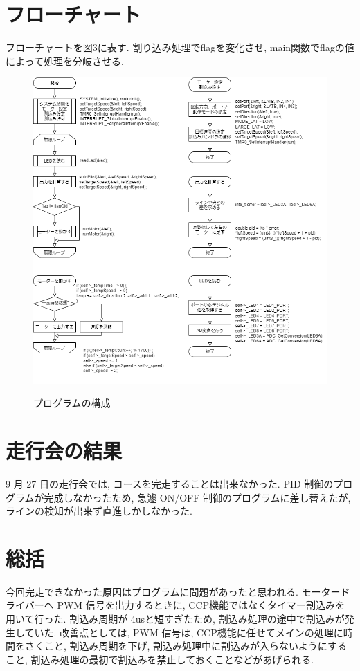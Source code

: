 \documentclass[
]{ltjarticle}
\begin{document}
\section{フローチャート}
フローチャートを図3に表す. 
    割り込み処理でflagを変化させ, main関数でflagの値によって処理を分岐させる. 
\begin{figure}[H]
\centering
\includegraphics[width=\linewidth]{report/fig3.drawio.png}
\label{fig:fig3}
\caption{プログラムの構成}
\end{figure}
\section{走行会の結果}
9 月 27 日の走行会では, コースを完走することは出来なかった. PID 制御のプログラムが完成しなかったため, 急遽 ON/OFF 制御のプログラムに差し替えたが, ラインの検知が出来ず直進しかしなかった. 
\section{総括}
今回完走できなかった原因はプログラムに問題があったと思われる. モータードライバーへ PWM 信号を出力するときに, CCP機能ではなくタイマー割込みを用いて行った. 割込み周期が 4usと短すぎたため, 割込み処理の途中で割込みが発生していた. 改善点としては, PWM 信号は, CCP機能に任せてメインの処理に時間をさくこと, 割込み周期を下げ, 割込み処理中に割込みが入らないようにすること, 割込み処理の最初で割込みを禁止しておくことなどがあげられる. 
\end{document}
